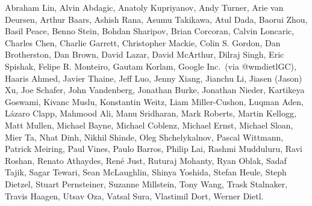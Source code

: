 Abraham Lin,
Alvin Abdagic,
Anatoly Kupriyanov,
Andy Turner,
Arie van Deursen,
Arthur Baars,
Ashish Rana,
Asumu Takikawa,
Atul Dada,
Baorui Zhou,
Basil Peace,
Benno Stein,
Bohdan Sharipov,
Brian Corcoran,
Calvin Loncaric,
Charles Chen,
Charlie Garrett,
Christopher Mackie,
Colin S. Gordon,
Dan Brotherston,
Dan Brown,
David Lazar,
David McArthur,
Dilraj Singh,
Eric Spishak,
Felipe R. Monteiro,
Gautam Korlam,
Google Inc.\ (via @wmdietlGC),
Haaris Ahmed,
Javier Thaine,
Jeff Luo,
Jenny Xiang,
Jianchu Li,
Jiasen (Jason) Xu,
Joe Schafer,
John Vandenberg,
Jonathan Burke,
Jonathan Nieder,
Kartikeya Goswami,
Kivanc Muslu,
Konstantin Weitz,
Liam Miller-Cushon,
Luqman Aden,
L\'azaro Clapp,
Mahmood Ali,
Manu Sridharan,
Mark Roberts,
Martin Kellogg,
Matt Mullen,
Michael Bayne,
Michael Coblenz,
Michael Ernst,
Michael Sloan,
Mier Ta,
Nhat Dinh,
Nikhil Shinde,
Oleg Shchelykalnov,
Pascal Wittmann,
Patrick Meiring,
Paul Vines,
Paulo Barros,
Philip Lai,
Rashmi Mudduluru,
Ravi Roshan,
Renato Athaydes,
Ren\'e Just,
Ruturaj Mohanty,
Ryan Oblak,
Sadaf Tajik,
Sagar Tewari,
Sean McLaughlin,
Shinya Yoshida,
Stefan Heule,
Steph Dietzel,
Stuart Pernsteiner,
Suzanne Millstein,
Tony Wang,
Trask Stalnaker,
Travis Haagen,
Utsav Oza,
Vatsal Sura,
Vlastimil Dort,
Werner Dietl.
